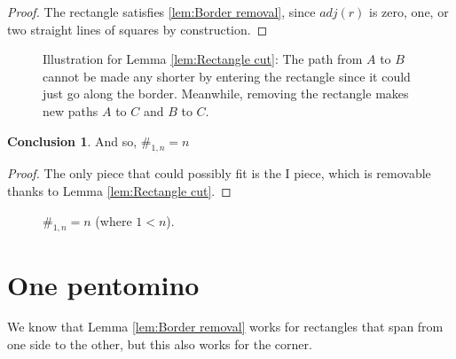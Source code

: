 \documentclass{article}
\theoremstyle{definition}%
\newtheorem*{conclusion}{Conclusion}
\begin{document}
\begin{proof}
The rectangle satisfies \ref{lem:Border removal}, since $adj(r)$ is zero, one, or two straight lines of squares by construction.
\end{proof}

\begin{figure}[htbp]
    \centering
    \caption{Illustration for Lemma \ref{lem:Rectangle cut}: The path from $A$ to $B$ cannot be made any shorter by entering the rectangle since it could just go along the border. Meanwhile, removing the rectangle makes new paths $A$ to $C$ and $B$ to $C$.}
\end{figure}

\begin{conclusion}
And so, $\#_{1, n} = n$
\end{conclusion}

\begin{proof}
The only piece that could possibly fit is the I piece, which is removable thanks to Lemma \ref{lem:Rectangle cut}.
\end{proof}

\begin{figure}[htbp]
    \centering
    \caption{$\#_{1, n} = n$ (where $1 < n$). \cite{sheet}}
\end{figure}





\section{One pentomino}

We know that Lemma \ref{lem:Border removal} works for rectangles that span from one side to the other, but this also works for the corner.
\end{document}

